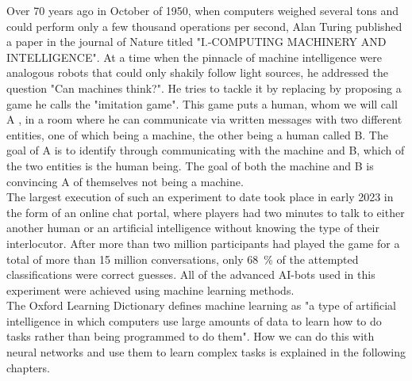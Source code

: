 Over 70 years ago in October of 1950, when computers weighed several tons and could perform only a few thousand operations per second, Alan Turing published a paper in the journal of Nature titled "I.-COMPUTING MACHINERY AND INTELLIGENCE"\cite{TuringThinkingPaper}. At a time when the pinnacle of machine intelligence were analogous robots that could only shakily follow light sources\cite{FirstThinkingMachinesArticle}, he addressed the question "Can machines think?". He tries to tackle it by replacing by proposing a game he calls the "imitation game". This game puts a human, whom we will call A , in a room where he can communicate via written messages with two different entities, one of which being a machine, the other being a human called B. The goal of A is to identify through communicating with the machine and B, which of the two entities is the human being. The goal of both the machine and B is convincing A of themselves not being a machine.\\
The largest execution of such an experiment to date took place in early 2023 in the form of an online chat portal, where players had two minutes to talk to either another human or an artificial intelligence without knowing the type of their interlocutor. After more than two million participants had played the game for a total of more than 15 million conversations, only \SI{68}{\percent} of the attempted classifications were correct guesses. All of the advanced AI-bots used in this experiment were achieved using machine learning methods.\\
The Oxford Learning Dictionary defines machine learning as "a type of artificial intelligence in which computers use large amounts of data to learn how to do tasks rather than being programmed to do them"\cite{MLDefinition}. How we can do this with neural networks and use them to learn complex tasks is explained in the following chapters.

